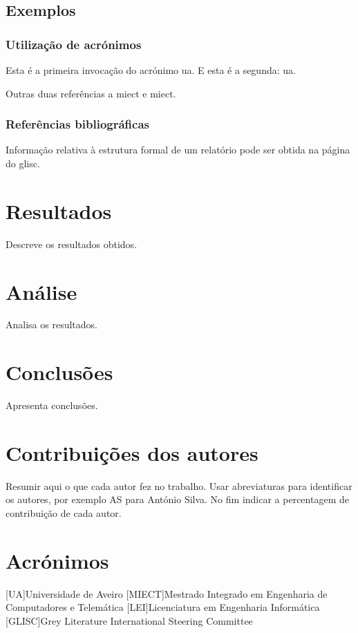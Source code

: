 \documentclass{report}
\begin{document}
\section{Exemplos}

\subsection{Utilização de acrónimos}
Esta é a primeira invocação do acrónimo \ac{ua}.
E esta é a segunda: \ac{ua}.

Outras duas referências a \ac{miect}
e \ac{miect}.

\subsection{Referências bibliográficas}
Informação relativa à estrutura formal de um relatório pode ser obtida
na página do \ac{glisc}\cite{glisc}.

\chapter{Resultados}
\label{chap.resultados}
Descreve os resultados obtidos.

\chapter{Análise}
\label{chap.analise}
Analisa os resultados.

\chapter{Conclusões}
\label{chap.conclusao}
Apresenta conclusões.

\chapter*{Contribuições dos autores}
Resumir aqui o que cada autor fez no trabalho.
Usar abreviaturas para identificar os autores,
por exemplo AS para António Silva.
No fim indicar a percentagem de contribuição de cada autor.

\chapter*{Acrónimos}
\begin{acronym}
[UA]{Universidade de Aveiro}
[MIECT]{Mestrado Integrado em Engenharia de Computadores e Telemática}
[LEI]{Licenciatura em Engenharia Informática}
[GLISC]{Grey Literature International Steering Committee}
\end{acronym}


\printbibliography
\end{document}
